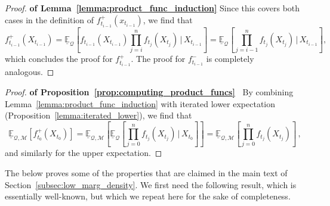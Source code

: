 \documentclass[3p]{elsarticle}
\newcommand{\lexp}{\underline{\mathbb{E}}_{\rateset,\mathcal{M}}}
\newcommand{\rateset}{\mathcal{Q}}
\begin{document}
\begin{proof}{\bf of Lemma~\ref{lemma:product_func_induction}}
Since this covers both cases in the definition of $f_{t_{i-1}}^+(x_{t_{i-1}})$, we find that
\begin{equation*}
f_{t_{i-1}}^+(X_{t_{i-1}}) = \underline{\mathbb{E}}_{\rateset}\left[f_{t_{i-1}}(X_{t_{i-1}})\prod_{j=i}^{n}f_{t_j}(X_{t_j})\,\Bigg\vert\,X_{t_{i-1}}\right] = \underline{\mathbb{E}}_{\rateset}\left[\prod_{j={i-1}}^{n}f_{t_j}(X_{t_j})\,\Bigg\vert\,X_{t_{i-1}}\right],
\end{equation*}
which concludes the proof for $f_{t_{i-1}}^+$. The proof for $f_{t_{i-1}}^-$ is completely analogous.
\end{proof}

\begin{proof}{\bf of Proposition~\ref{prop:computing_product_funcs}~}
By combining Lemma~\ref{lemma:product_func_induction} with iterated lower expectation (Proposition~\ref{lemma:iterated_lower}), we find that
\begin{equation*}
\lexp\left[f_{t_0}^+(X_{t_0})\right] = \lexp\left[\underline{\mathbb{E}}_{\rateset}\left[\prod_{j=0}^{n}f_{t_j}(X_{t_j})\,\Bigg\vert\,X_{t_0}\right]\right] = \lexp\left[\prod_{j=0}^{n}f_{t_j}(X_{t_j})\right]\,,%
\end{equation*}
and similarly for the upper expectation.
\end{proof}


The below proves some of the properties that are claimed in the main text of Section~\ref{subsec:low_marg_density}. We first need the following result, which is essentially well-known, but which we repeat here for the sake of completeness.
\end{document}
